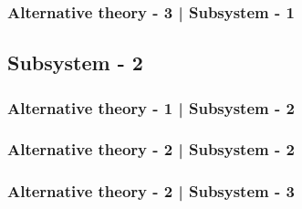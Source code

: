 \subsubsection{Alternative theory - 3 | Subsystem - 1}\label{Discharge_Resistor_Section}

\newpage
\subsection{Subsystem - 2}\label{Subsystem -2 }
\subsubsection{Alternative theory - 1 | Subsystem - 2}
\subsubsection{Alternative theory - 2 | Subsystem - 2}
\subsubsection{Alternative theory - 2 | Subsystem - 3}
